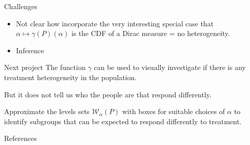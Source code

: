 \documentclass[smaller, aspectratio=169]{beamer}\usepackage{listings}
\newcommand{\1}{\mathds{1}}
\begin{document}
\begin{frame}[label={sec:orgb77e8d7}]{Challenges}
\vfill

\begin{itemize}
\item Not clear how incorporate the very interesting special case that
\(\alpha \mapsto \gamma(P)(\alpha)\) is the CDF of a Dirac measure =
no heterogeneity.
\end{itemize}

\vfill

\begin{itemize}
\item Inference
\end{itemize}

\vfill
\end{frame}


\begin{frame}[label={sec:org4afa823}]{Next project}
The function \(\gamma\) can be used to visually investigate if there is
any treatment heterogeneity in the population.

\vfill


But it does not tell us who the people are that respond differently.

\vfill


Approximate the levels sets \(\mathcal{W}_{\alpha}(P)\) with boxes
for suitable choices of \(\alpha\) to identify subgroups that can be
expected to respond differently to treatment.
\end{frame}


\begin{frame}[label={sec:org5860268}]{References}
\footnotesize 
\end{frame}
\end{document}
